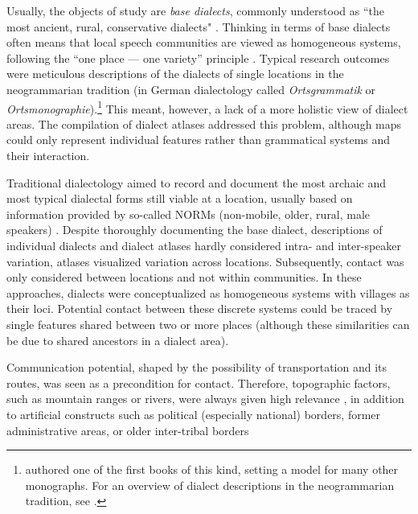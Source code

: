 \documentclass[output=paper]{langscibook}
\begin{document}
Usually, the objects of study are \textit{base dialects},  commonly understood as “the most ancient, rural, conservative dialects" \parencite[7--8]{Auer2005}. Thinking in terms of base dialects often means that local speech communities are viewed as homogeneous systems, following the  “one place --- one variety” principle \parencite[196]{Stoeckle2016a}.
Typical research outcomes were meticulous descriptions of the dialects of single locations in the neogrammarian tradition (in German dialectology called \textit{Ortsgrammatik} or \textit{Ortsmonographie}).\footnote{\citet{Winteler1876} authored one of the first books of this kind, setting a model for many other monographs. For an overview of dialect descriptions in the neogrammarian tradition,  see \citet{Murray2010}.} This meant, however, a lack of a more holistic view of dialect areas. The compilation of dialect atlases addressed this problem, although maps could only represent individual features rather than grammatical systems and their interaction. 

Traditional dialectology aimed to record and document the most archaic and most typical dialectal forms still viable at a location, usually based on information provided by so-called NORMs  (non-mobile, older, rural, male speakers) \parencite[29]{Chambers2004}. Despite thoroughly documenting the base dialect, descriptions of individual dialects and dialect atlases hardly considered intra- and inter-speaker variation, atlases visualized variation across locations. Subsequently, contact was only considered between locations and not within communities. In these approaches, dialects were conceptualized as homogeneous systems with villages as their loci. Potential contact between these discrete systems could be traced by single  features shared between two or more places (although  these similarities can be due to shared ancestors in a dialect area). 

Communication potential, shaped by the possibility of transportation and its routes, was seen as a precondition for contact. Therefore, topographic factors, such as mountain ranges or rivers, were always given high relevance \parencites[see e.g.][40--41]{Paul1880}[29--33]{Pickl2014}, in addition to artificial constructs such as political (especially national) borders, former administrative areas, or older inter-tribal borders \parencites[cf.][chap.~2]{Haag1898}[]{Derungs2019}
\end{document}
